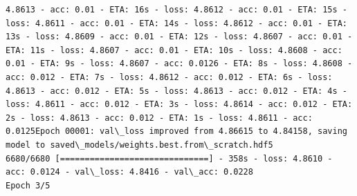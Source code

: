\documentclass[11pt]{article}
\begin{document}
\begin{Verbatim}[commandchars=\\\{\}]
4.8613 - acc: 0.01 - ETA: 16s - loss: 4.8612 - acc: 0.01 - ETA: 15s - loss: 4.8611 - acc: 0.01 - ETA: 14s - loss: 4.8612 - acc: 0.01 - ETA: 13s - loss: 4.8609 - acc: 0.01 - ETA: 12s - loss: 4.8607 - acc: 0.01 - ETA: 11s - loss: 4.8607 - acc: 0.01 - ETA: 10s - loss: 4.8608 - acc: 0.01 - ETA: 9s - loss: 4.8607 - acc: 0.0126 - ETA: 8s - loss: 4.8608 - acc: 0.012 - ETA: 7s - loss: 4.8612 - acc: 0.012 - ETA: 6s - loss: 4.8613 - acc: 0.012 - ETA: 5s - loss: 4.8613 - acc: 0.012 - ETA: 4s - loss: 4.8611 - acc: 0.012 - ETA: 3s - loss: 4.8614 - acc: 0.012 - ETA: 2s - loss: 4.8613 - acc: 0.012 - ETA: 1s - loss: 4.8611 - acc: 0.0125Epoch 00001: val\_loss improved from 4.86615 to 4.84158, saving model to saved\_models/weights.best.from\_scratch.hdf5
6680/6680 [==============================] - 358s - loss: 4.8610 - acc: 0.0124 - val\_loss: 4.8416 - val\_acc: 0.0228
Epoch 3/5

\end{Verbatim}
\end{document}
